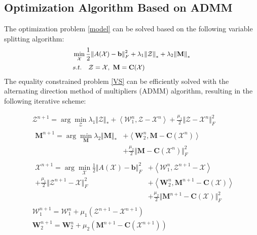 \documentclass{article}
\begin{document}
\subsection{Optimization Algorithm Based on ADMM}
\label{classical alg}

The optimization problem \eqref{model} can be solved based on the following variable splitting algorithm:
\begin{equation}
  \small
  \label{VS}
  \begin{aligned}
    &\min_{\mathcal{X}} \frac12 {\Vert A(\mathcal{X})-\mathbf b \Vert}_F^2+\lambda_1{\Vert \mathcal{Z} \Vert}_*+\lambda_2{\Vert \mathbf M \Vert}_* \\
    &s.t. \quad \mathcal{Z} = \mathcal{X},\  \mathbf M = \mathbf C (\mathcal{X})
  \end{aligned}
  \end{equation}
The equality constrained problem \eqref{VS} can be efficiently solved with the alternating direction method of multipliers (ADMM) algorithm, resulting in the following iterative scheme:
\begin{footnotesize}
\begin{align}
  &\mathcal{Z}^{n+1}=\arg \min_{\mathcal{Z}} \lambda_1{\Vert \mathcal{Z} \Vert}_*+ \left \langle \mathcal{W}_1^{n}, \mathcal{Z}-\mathcal{X}^{n} \right \rangle + \frac{\mu_1}2 \Vert \mathcal{Z}-\mathcal{X}^{n} \Vert_F^2 \label{Z} \\
  &\begin{aligned}
    \mathbf M^{n+1}=\arg\min_{\mathbf M} \lambda_2{\Vert \mathbf M \Vert}_* &+ \left \langle \mathbf{W}_2^{n}, \mathbf M-\mathbf C (\mathcal{X}^{n}) \right \rangle \\
     &+ \frac{\mu_2}2 \Vert \mathbf M-\mathbf C (\mathcal{X}^{n}) \Vert_F^2 \label{M} 
  \end{aligned} \\
  &\begin{aligned}
    \mathcal{X}^{n+1}=\arg\min_{\mathcal{X}} \frac12 {\Vert A(\mathcal{X})-\mathbf b \Vert}_F^2 &+ \left \langle \mathcal{W}_1^{n}, \mathcal{Z}^{n+1}-\mathcal{X} \right \rangle \\
    + \frac{\mu_1}2 \Vert \mathcal{Z}^{n+1}-\mathcal{X} \Vert_F^2& + \left \langle \mathbf{W}_2^{n}, \mathbf M^{n+1}-\mathbf C (\mathcal{X}) \right \rangle \\
    &+ \frac{\mu_2}2 \Vert \mathbf M^{n+1}-\mathbf C (\mathcal{X}) \Vert_F^2 \label{x1}
  \end{aligned} \\
  &\mathcal{W}_1^{n+1} = \mathcal{W}_1^{n}+\mu_1(\mathcal{Z}^{n+1}-\mathcal{X}^{n+1})\\
  &\mathbf W_2^{n+1} = \mathbf W_2^{n}+\mu_2(\mathbf M^{n+1}-\mathbf C (\mathcal{X}^{n+1}))
\end{align}
\end{footnotesize}
\end{document}
